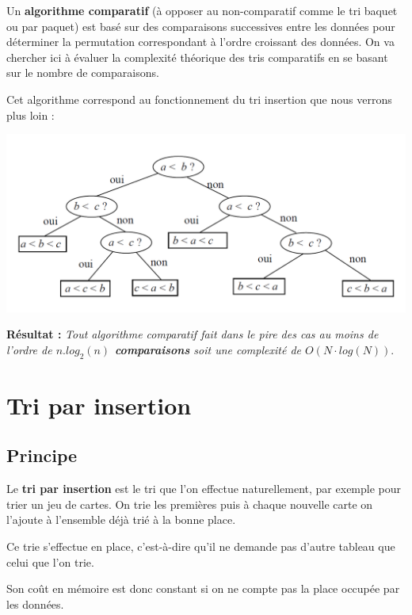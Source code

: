 \begin{exemple2}

Un \textbf{algorithme comparatif} (à opposer au non-comparatif comme le tri baquet ou par paquet) est basé sur des comparaisons successives entre les données pour déterminer la permutation correspondant à l'ordre croissant des données.
On va chercher ici à évaluer la complexité théorique des tris comparatifs en se basant sur le nombre de comparaisons.

Cet algorithme correspond au fonctionnement du tri insertion que nous verrons plus loin :

\begin{center}
\includegraphics[width=.6\textwidth]{images/C2.png}
\end{center}

\textbf{Résultat :}\textit{ Tout algorithme comparatif fait dans le pire des cas au moins de l'ordre de
\textbf{$n.log_2(n)$ comparaisons} soit une complexité de \textbf{$O(N\cdot log(N))$}}.
\end{exemple2}

\section{Tri par insertion}
\subsection{Principe}

\begin{definition2}
Le \textbf{tri par insertion} est le tri que l'on effectue naturellement, par exemple pour trier un jeu de cartes. On trie les premières puis à chaque nouvelle carte on l'ajoute à l'ensemble déjà trié à la bonne place. 

Ce trie s'effectue en place, c'est-à-dire qu'il ne demande pas d'autre tableau que celui que l'on trie. 

Son coût en mémoire est donc constant si on ne compte pas la place occupée par les données.
\end{definition2}


